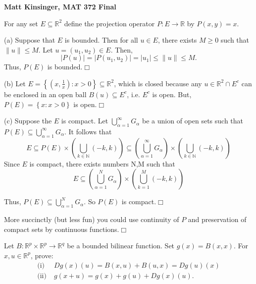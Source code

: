 \documentclass[11pt]{article}
\begin{document}
\vspace*{-.6in}

\begin{center}
{\Large\bf Matt Kinsinger, MAT 372 Final}

\end{center}

\vspace{.5in} 

\noindent {\bf [1]} For any set $E\subseteq \mathbb{R}^2$ define the projection operator $P:E\rightarrow\mathbb{R}$ by $P(x,y)=x$.

\vspace{.2in}

\noindent (a) Suppose that $E$ is bounded. Then for all $u\in E$, there exists $M\geq 0$ such that $\|u\|\leq M$. Let $u=(u_1,u_2)\in E$. Then,
\[
|P(u)|=|P(u_1,u_2)|=|u_1|\leq \|u\|\leq M.
\]
Thus, $P(E)$ is bounded.\hfill $\Box$

\vspace{.2in}

\noindent (b) Let $E=\left\{(x,\frac{1}{x}):x>0\right\}\subseteq\mathbb{R}^2$, which is closed because any $u\in\mathbb{R}^2\cap E^c$ can be enclosed in an open ball $B(u)\subseteq E^c$, i.e. $E^c$ is open. But, $P(E)=\left\{x:x>0\right\}$ is open.\hfill $\Box$

\vspace{.2in}

\noindent (c) Suppose the $E$ is compact. Let $\bigcup\limits_{\alpha =1}^\infty G_\alpha$ be a union of open sets such that $P(E)\subseteq\bigcup\limits_{\alpha =1}^\infty G_\alpha$. It follows that
\[
E\subseteq P(E)\times\left(\bigcup\limits_{k\in\mathbb{N}}(-k,k)\right)\subseteq \left(\bigcup\limits_{\alpha =1}^\infty G_\alpha\right)\times \left(\bigcup\limits_{k\in\mathbb{N}}(-k,k)\right)
\] 
Since $E$ is compact, there exists numbers N,M such that 
\[
E\subseteq \left(\bigcup\limits_{\alpha =1}^N G_\alpha\right)\times \left(\bigcup\limits_{k=1}^M(-k,k)\right)
\]

\noindent Thus, $P(E)\subseteq \bigcup\limits_{\alpha =1}^N G_\alpha$. So $P(E)$ is compact.\hfill $\Box$

\vspace{.2in}

\noindent More succinctly (but less fun) you could use continuity of $P$ and preservation of compact sets by continuous functions.\hfill $\Box$

\newpage

\noindent {\bf [2]} Let $B:\mathbb{R}^p\times\mathbb{R}^p\rightarrow\mathbb{R}^q$ be a bounded bilinear function. Set $g(x)=B(x,x)$. For $x,u\in\mathbb{R}^p$, prove:
\begin{align*}
\text{(i)}&\;Dg(x)(u)=B(x,u)+B(u,x)=Dg(u)(x)\\\text{(ii)}&\;g(x+u)=g(x)+g(u)+Dg(x)(u).
\end{align*}
\end{document}
